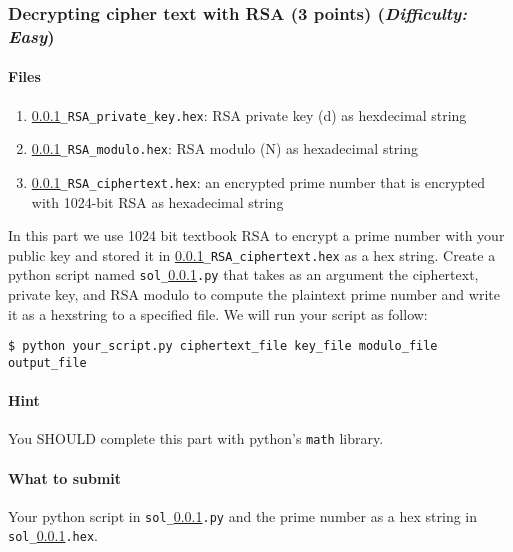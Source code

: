 \documentclass[letterpaper,12pt]{report}
\begin{document}
\subsubsection{Decrypting cipher text with RSA (3 points)  \hfill\rm\normalsize (\emph{Difficulty: Easy})}
\label{sec:decrypt_rsa}
\paragraph{Files}

\begin{enumerate}
\item {\tt \ref{sec:decrypt_rsa}\_RSA\_private\_key.hex}: RSA private key (d) as hexdecimal string
\item {\tt \ref{sec:decrypt_rsa}\_RSA\_modulo.hex}: RSA modulo (N) as hexadecimal string
\item {\tt \ref{sec:decrypt_rsa}\_RSA\_ciphertext.hex}: an encrypted prime number that is encrypted with 1024-bit RSA as hexadecimal string
\end{enumerate}

In this part we use 1024 bit textbook RSA to encrypt a prime number with your public key and stored it in {\tt \ref{sec:decrypt_rsa}\_RSA\_ciphertext.hex} as a hex string.  Create a python script named \texttt{sol\_\ref{sec:decrypt_rsa}.py} that takes as an argument the ciphertext, private key, and RSA modulo to compute the plaintext prime number and write it as a hexstring to a specified file. We will run your script as follow:
\begin{mdframed}
\begin{verbatim}
$ python your_script.py ciphertext_file key_file modulo_file output_file
\end{verbatim}
\end{mdframed}

\paragraph{Hint} You SHOULD complete this part with python's \texttt{math} library. 

\smallskip
\noindent

\paragraph{What to submit}
Your python script in \texttt{sol\_\ref{sec:decrypt_rsa}.py} and the prime number as a hex string in \texttt{sol\_\ref{sec:decrypt_rsa}.hex}.
\end{document}
